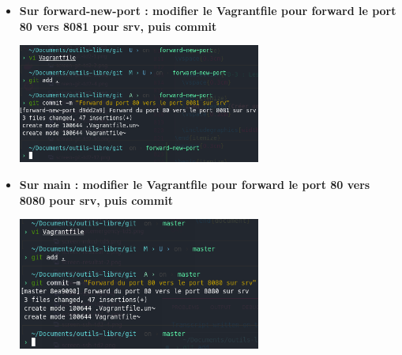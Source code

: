 \documentclass[12pt]{article}
\begin{document}
\begin{itemize}
  \item \textbf{Sur forward-new-port : modifier le Vagrantfile pour forward le port 80 vers 8081 pour srv, puis commit}
  \vspace{0.3cm}

  \includegraphics[width=8cm]{images/screen-git-td3-2.png}
\end{itemize}
\vspace{0.3cm}

\begin{itemize}
  \item \textbf{Sur main : modifier le Vagrantfile pour forward le port 80 vers 8080 pour srv, puis commit}
  \vspace{0.3cm}

  \includegraphics[width=8cm]{images/screen-git-td3-3.png}
\end{itemize}
\end{document}
